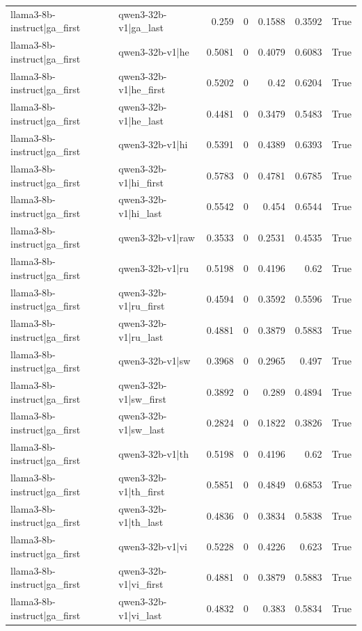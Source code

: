 \begin{table}
\begin{tabular}{l l r r r r l}
llama3-8b-instruct|ga_first & qwen3-32b-v1|ga_last & 0.259 & 0 & 0.1588 & 0.3592 & True \\
llama3-8b-instruct|ga_first & qwen3-32b-v1|he & 0.5081 & 0 & 0.4079 & 0.6083 & True \\
llama3-8b-instruct|ga_first & qwen3-32b-v1|he_first & 0.5202 & 0 & 0.42 & 0.6204 & True \\
llama3-8b-instruct|ga_first & qwen3-32b-v1|he_last & 0.4481 & 0 & 0.3479 & 0.5483 & True \\
llama3-8b-instruct|ga_first & qwen3-32b-v1|hi & 0.5391 & 0 & 0.4389 & 0.6393 & True \\
llama3-8b-instruct|ga_first & qwen3-32b-v1|hi_first & 0.5783 & 0 & 0.4781 & 0.6785 & True \\
llama3-8b-instruct|ga_first & qwen3-32b-v1|hi_last & 0.5542 & 0 & 0.454 & 0.6544 & True \\
llama3-8b-instruct|ga_first & qwen3-32b-v1|raw & 0.3533 & 0 & 0.2531 & 0.4535 & True \\
llama3-8b-instruct|ga_first & qwen3-32b-v1|ru & 0.5198 & 0 & 0.4196 & 0.62 & True \\
llama3-8b-instruct|ga_first & qwen3-32b-v1|ru_first & 0.4594 & 0 & 0.3592 & 0.5596 & True \\
llama3-8b-instruct|ga_first & qwen3-32b-v1|ru_last & 0.4881 & 0 & 0.3879 & 0.5883 & True \\
llama3-8b-instruct|ga_first & qwen3-32b-v1|sw & 0.3968 & 0 & 0.2965 & 0.497 & True \\
llama3-8b-instruct|ga_first & qwen3-32b-v1|sw_first & 0.3892 & 0 & 0.289 & 0.4894 & True \\
llama3-8b-instruct|ga_first & qwen3-32b-v1|sw_last & 0.2824 & 0 & 0.1822 & 0.3826 & True \\
llama3-8b-instruct|ga_first & qwen3-32b-v1|th & 0.5198 & 0 & 0.4196 & 0.62 & True \\
llama3-8b-instruct|ga_first & qwen3-32b-v1|th_first & 0.5851 & 0 & 0.4849 & 0.6853 & True \\
llama3-8b-instruct|ga_first & qwen3-32b-v1|th_last & 0.4836 & 0 & 0.3834 & 0.5838 & True \\
llama3-8b-instruct|ga_first & qwen3-32b-v1|vi & 0.5228 & 0 & 0.4226 & 0.623 & True \\
llama3-8b-instruct|ga_first & qwen3-32b-v1|vi_first & 0.4881 & 0 & 0.3879 & 0.5883 & True \\
llama3-8b-instruct|ga_first & qwen3-32b-v1|vi_last & 0.4832 & 0 & 0.383 & 0.5834 & True \\

\end{tabular}
\end{table}
